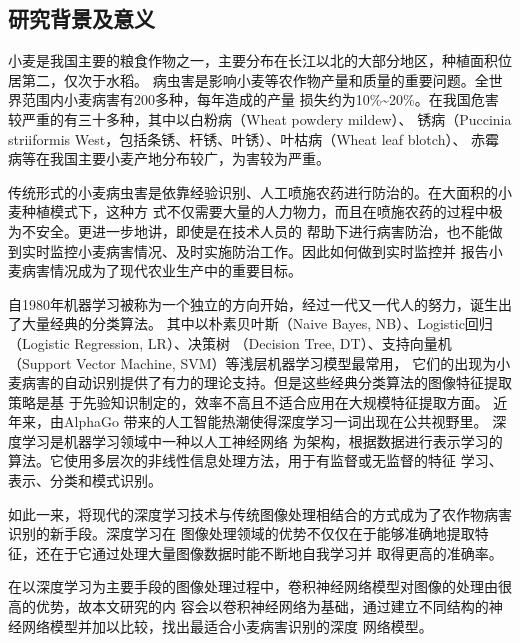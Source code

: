 
\subsection{\textbf{研究背景及意义}}
小麦是我国主要的粮食作物之一，主要分布在长江以北的大部分地区，种植面积位居第二，仅次于水稻。
病虫害是影响小麦等农作物产量和质量的重要问题。全世界范围内小麦病害有200多种，每年造成的产量
损失约为10\%\textasciitilde20\%。在我国危害较严重的有三十多种，其中以白粉病（Wheat powdery mildew）、
锈病（Puccinia striiformis West，包括条锈、杆锈、叶锈）、叶枯病（Wheat leaf blotch）、
赤霉病等在我国主要小麦产地分布较广，为害较为严重\cite{CGRIS}。

传统形式的小麦病虫害是依靠经验识别、人工喷施农药进行防治的。在大面积的小麦种植模式下，这种方
式不仅需要大量的人力物力，而且在喷施农药的过程中极为不安全。更进一步地讲，即使是在技术人员的
帮助下进行病害防治，也不能做到实时监控小麦病害情况、及时实施防治工作。因此如何做到实时监控并
报告小麦病害情况成为了现代农业生产中的重要目标。

自1980年机器学习被称为一个独立的方向开始，经过一代又一代人的努力，诞生出了大量经典的分类算法。
其中以朴素贝叶斯（Naive Bayes, NB）、Logistic回归（Logistic Regression, LR）、决策树
（Decision Tree, DT）、支持向量机（Support Vector Machine, SVM）等浅层机器学习模型最常用，
它们的出现为小麦病害的自动识别提供了有力的理论支持。但是这些经典分类算法的图像特征提取策略是基
于先验知识制定的，效率不高且不适合应用在大规模特征提取方面\cite{article1}。 近年来，由AlphaGo
带来的人工智能热潮使得深度学习一词出现在公共视野里。 深度学习是机器学习领域中一种以人工神经网络
为架构，根据数据进行表示学习的算法。它使用多层次的非线性信息处理方法，用于有监督或无监督的特征
学习、表示、分类和模式识别。

如此一来，将现代的深度学习技术与传统图像处理相结合的方式成为了农作物病害识别的新手段。深度学习在
图像处理领域的优势不仅仅在于能够准确地提取特征，还在于它通过处理大量图像数据时能不断地自我学习并
取得更高的准确率。

在以深度学习为主要手段的图像处理过程中，卷积神经网络模型对图像的处理由很高的优势，故本文研究的内
容会以卷积神经网络为基础，通过建立不同结构的神经网络模型并加以比较，找出最适合小麦病害识别的深度
网络模型。
